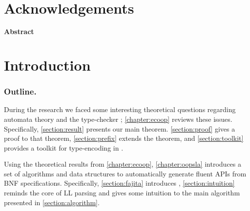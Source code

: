 \documentclass[12pt]{book}
\begin{document}
\maketitle
\frontmatter

\chapter*{Acknowledgements}
\label{chapter:acknowledgements}


\cleardoublepage{}
\begin{centering}
  \hfill \Large\bfseries Abstract\hfill
\end{centering}
\begin{quote}
  \slshape
  \large
  
\end{quote}

\tableofcontents
\cleardoublepage{}
{}
\listoftables
\cleardoublepage{}
{}
\cleardoublepage{}
\listoffigures
\cleardoublepage{}
{}
\listofalgorithms
\cleardoublepage{}
{}
\lstlistoflistings

\mainmatter

\chapter{Introduction}
\label{chapter:introduction}


\subsection*{Outline.}

During the research we faced some interesting theoretical questions regarding
automata theory and the \Java type-checker ; \cref{chapter:ecoop} reviews
these issues. Specifically, \cref{section:result} presents our main theorem.
\cref{section:proof} gives a proof to that theorem, \cref{section:prefix}
extends the theorem, and \cref{section:toolkit} provides a toolkit for type-encoding
in \Java.

Using the theoretical results from \cref{chapter:ecoop}, \cref{chapter:oopsla}
introduces a set of algorithms and data structures to automatically generate
fluent APIs from BNF specifications. Specifically,
\cref{section:fajita} introduces \Fajita, \cref{section:intuition}
reminds the core of LL parsing and gives some intuition to the main algorithm
presented in \cref{section:algorithm}.
\end{document}
